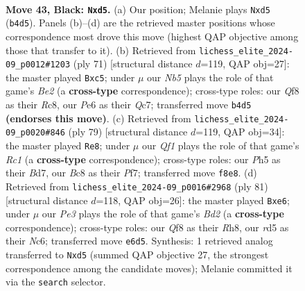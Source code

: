 \documentclass[11pt]{article}
\begin{document}
\clearpage

\begin{figure}[p]\centering
\begin{subfigure}{0.46\textwidth}\centering
\resizebox{\linewidth}{!}{%
\newchessgame
\chessboard[
  setfen={rnb2q2/1p4k1/4p3/p2R1pNp/PnN2P2/1P2Q1P1/4B1KP/7R b - - 0 43},
  showmover=false,
  pgfstyle=straightmove, color=movearrow, markmove={b4-d5}
]}
\caption{}
\end{subfigure}\hfill
\begin{subfigure}{0.46\textwidth}\centering
\resizebox{\linewidth}{!}{%
\newchessgame
\chessboard[
  setfen={2r5/1pq1bpk1/p3p1p1/2NpP3/2nP3p/5R1P/P4PP1/2BQ2K1 b - - 5 36},
  showmover=false,
  pgfstyle=straightmove, color=movearrow, markmove={e7-c5}
]}
\caption{}
\end{subfigure}
\\[4pt]
\begin{subfigure}{0.46\textwidth}\centering
\resizebox{\linewidth}{!}{%
\newchessgame
\chessboard[
  setfen={2r3k1/3b1p2/p4q1p/1p1pR1p1/3N1P2/1PP3P1/P2Q2P1/6K1 b - - 2 40},
  showmover=false,
  pgfstyle=straightmove, color=movearrow, markmove={c8-e8}
]}
\caption{}
\end{subfigure}\hfill
\begin{subfigure}{0.46\textwidth}\centering
\resizebox{\linewidth}{!}{%
\newchessgame
\chessboard[
  setfen={4k2r/3b4/2n1N3/2QpPpp1/qp1P3p/4B2P/3N1PPK/8 b - - 0 41},
  showmover=false,
  pgfstyle=straightmove, color=movearrow, markmove={d7-e6}
]}
\caption{}
\end{subfigure}
\caption{\textbf{Move 43, Black: \texttt{Nxd5}.} (a) Our position; Melanie plays \texttt{Nxd5} (\texttt{b4d5}). Panels (b)--(d) are the retrieved master positions whose correspondence most drove this move (highest QAP objective among those that transfer to it). (b) Retrieved from \texttt{lichess\_elite\_2024-09\_p0012\#1203} (ply 71) [structural distance $d$=119, QAP obj=27]: the master played \texttt{Bxc5}; under $\mu$ our \emph{Nb5} plays the role of that game's \emph{Be2} (a \textbf{cross-type} correspondence); cross-type roles: our \emph{Q}f8 as their \emph{R}c8, our \emph{P}e6 as their \emph{Q}c7; transferred move \texttt{b4d5} \textbf{(endorses this move)}. (c) Retrieved from \texttt{lichess\_elite\_2024-09\_p0020\#846} (ply 79) [structural distance $d$=119, QAP obj=34]: the master played \texttt{Re8}; under $\mu$ our \emph{Qf1} plays the role of that game's \emph{Rc1} (a \textbf{cross-type} correspondence); cross-type roles: our \emph{P}h5 as their \emph{B}d7, our \emph{B}c8 as their \emph{P}f7; transferred move \texttt{f8e8}. (d) Retrieved from \texttt{lichess\_elite\_2024-09\_p0016\#2968} (ply 81) [structural distance $d$=118, QAP obj=26]: the master played \texttt{Bxe6}; under $\mu$ our \emph{Pe3} plays the role of that game's \emph{Bd2} (a \textbf{cross-type} correspondence); cross-type roles: our \emph{Q}f8 as their \emph{R}h8, our \emph{r}d5 as their \emph{N}c6; transferred move \texttt{e6d5}. Synthesis: 1 retrieved analog transferred to \texttt{Nxd5} (summed QAP objective 27, the strongest correspondence among the candidate moves); Melanie committed it via the \texttt{search} selector.}
\label{fig:thought-m85}
\end{figure}
\end{document}
